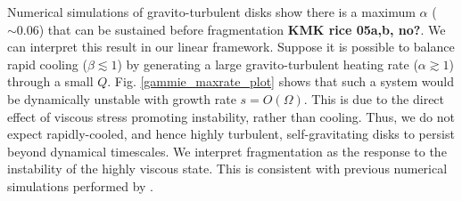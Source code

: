 Numerical simulations of gravito-turbulent disks show there is a
maximum $\alpha$ ($\sim 0.06$) that can be sustained before
fragmentation \citep{rice11} {\bf KMK rice 05a,b, no?}. We can interpret this result in our
linear framework. 
Suppose it is possible to balance rapid cooling ($\beta\lesssim1$) 
by generating a large gravito-turbulent heating rate
($\alpha\gtrsim 1$) through a small $Q$. Fig. \ref{gammie_maxrate_plot} 
shows that such a system would be dynamically unstable with 
growth rate $s = O(\Omega)$. This is due to the direct effect of viscous 
stress promoting instability, rather than cooling. Thus, we do not expect rapidly-cooled, 
and hence highly turbulent, self-gravitating disks to persist beyond
dynamical timescales.
We interpret fragmentation as the response to the instability of the
highly viscous state. This is consistent with previous numerical
simulations performed by \cite{lodato05}. 
